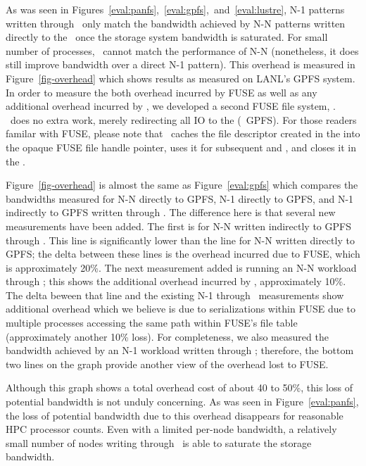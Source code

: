 

As was seen in
Figures~\ref{eval:panfs},~\ref{eval:gpfs},~and~\ref{eval:lustre}, N-1 patterns
written through \plfs\ only match the bandwidth achieved by N-N patterns
written directly to the \upfs\ once the storage system bandwidth is saturated.
For small number of processes, \plfs\ cannot match the performance of N-N
(nonetheless, it does still improve bandwidth over a direct N-1 pattern). This
overhead is measured in Figure~\ref{fig-overhead} which shows results as
measured on LANL's GPFS system. In order to measure the both overhead incurred
by FUSE as well as any additional overhead incurred by \plfs, we developed a
second FUSE file system, \Term{\noopfs}.  \noopfs\ does no extra work, merely
redirecting all IO to the \upfs (\ie\ GPFS). For those readers familar with
FUSE, please note that \noopfs\ caches the file descriptor created in the
 into the opaque FUSE file handle pointer, uses it for subsequent
 and , and closes it in the .

Figure~\ref{fig-overhead} is almost the same as Figure~\ref{eval:gpfs} which
compares the bandwidths measured for N-N directly to GPFS, N-1 directly to
GPFS, and N-1 indirectly to GPFS written through \plfs. The difference here is
that several new measurements have been added. The first is for N-N written
indirectly to GPFS through \noopfs. This line is significantly lower than the
line for N-N written directly to GPFS; the delta between these lines is the
overhead incurred due to FUSE, which is approximately 20\%. The next
measurement added is running an N-N workload through \plfs; this shows the
additional overhead incurred by \plfs, approximately 10\%. 
The delta beween that line and the existing N-1 through \plfs\
measurements show additional overhead which we believe is due to serializations
within FUSE due to multiple processes accessing the same path within FUSE's
file table (approximately another 10\% loss). For completeness, we also
measured the bandwidth achieved by an N-1 workload written through \noopfs;
therefore, the bottom two lines on the graph provide another view of the
overhead lost to FUSE.

Although this graph shows a total overhead cost of about 40 to 50\%, this loss
of potential bandwidth is not unduly concerning. As was seen in
Figure~\ref{eval:panfs}, the loss of potential bandwidth due to this overhead
disappears for reasonable HPC processor counts. Even with a limited per-node
bandwidth, a relatively small number of nodes writing through \plfs\ is able to
saturate the storage bandwidth. 


